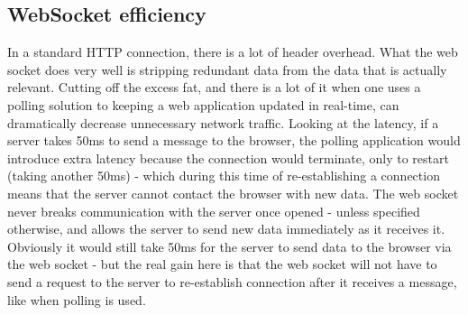 \subsection{WebSocket efficiency}


In a standard HTTP connection, there is a lot of header overhead\cite{lubbersgreco}. What the web socket does very well is stripping redundant data from the data that is actually relevant. Cutting off the excess fat, and there is a lot of it when one uses a polling solution to keeping a web application updated in real-time, can dramatically decrease unnecessary network traffic\cite{lubbersgreco}. Looking at the latency, if a server takes 50ms to send a message to the browser, the polling application would introduce extra latency because the connection would terminate, only to restart (taking another 50ms) - which during this time of re-establishing a connection means that the server cannot contact the browser with new data\cite{lubbersgreco}. The web socket never breaks communication with the server once opened - unless specified otherwise, and allows the server to send new data immediately as it receives it\cite{lubbersgreco}. Obviously it would still take 50ms for the server to send data to the browser via the web socket - but the real gain here is that the web socket will not have to send a request to the server to re-establish connection after it receives a message, like when polling is used\cite{lubbersgreco}.